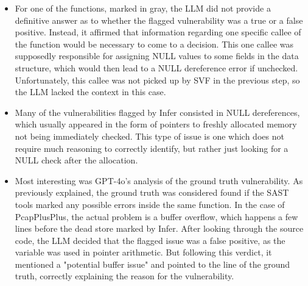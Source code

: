 \begin{itemize}
    \item For one of the functions, marked in gray, the LLM did not provide a definitive answer as to whether the flagged vulnerability was a true or a false positive. Instead, it affirmed that information regarding one specific callee of the function would be necessary to come to a decision. This one callee was supposedly responsible for assigning NULL values to some fields in the data structure, which would then lead to a NULL dereference error if unchecked. Unfortunately, this callee was not picked up by SVF in the previous step, so the LLM lacked the context in this case.
    \item Many of the vulnerabilities flagged by Infer consisted in NULL dereferences, which usually appeared in the form of pointers to freshly allocated memory not being immediately checked. This type of issue is one which does not require much reasoning to correctly identify, but rather just looking for a NULL check after the allocation.
    \item Most interesting was GPT-4o's analysis of the ground truth vulnerability. As previously explained, the ground truth was considered found if the SAST tools marked any possible errors inside the same function. In the case of PcapPlusPlus, the actual problem is a buffer overflow, which happens a few lines before the dead store marked by Infer. After looking through the source code, the LLM decided that the flagged issue was a false positive, as the variable was used in pointer arithmetic. But following this verdict, it mentioned a "potential buffer issue" and pointed to the line of the ground truth, correctly explaining the reason for the vulnerability.
\end{itemize}

